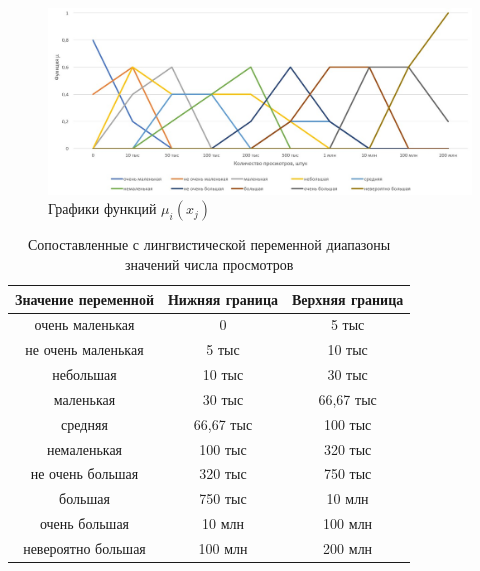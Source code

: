 \captionsetup{justification=centering,singlelinecheck=false}
\begin{figure}[H]
	\centering
	\includegraphics[width=1\linewidth]{inc/img/time}
	\caption{Графики функций $\mu_i(x_j)$ }
	\label{fig:exp}
\end{figure}

\captionsetup{justification=raggedright,singlelinecheck=false}
\begin{table}[H]
	\begin{center}
		\begin{threeparttable}
		\caption{\label{tbl:interval}Сопоставленные с лингвистической переменной диапазоны значений числа просмотров}
		\begin{tabular}{|c|c|c|}
			\hline
			Значение переменной & Нижняя граница& Верхняя граница\\\hline
			очень маленькая	&	0	&	5 тыс	\\\hline
			не очень маленькая	&	5 тыс	&	10 тыс	\\\hline
			небольшая	&	10 тыс	&	30 тыс	\\\hline
			маленькая	&	30 тыс	&	66,67 тыс	\\\hline
			средняя	&	66,67 тыс	&	100 тыс	\\\hline
			немаленькая	&	100 тыс	&	320 тыс	\\\hline
			не очень большая	&	320 тыс	&	750 тыс	\\\hline
			большая	&	750 тыс	&	10 млн	\\\hline
			очень большая	&	10 млн	&	100 млн	\\\hline
			невероятно большая	&	100 млн 	&	200 млн	\\\hline
			
		\end{tabular}
	\end{threeparttable}
	\end{center}
\end{table} 

